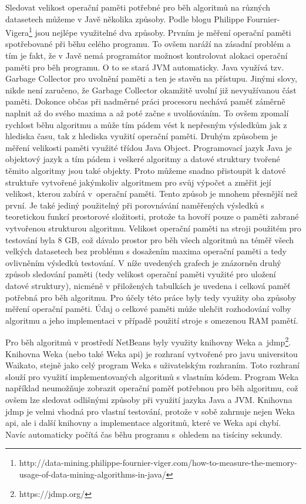 \documentclass[12pt]{article}
\begin{document}
Sledovat velikost operační paměti potřebné pro běh algoritmů na různých datasetech můžeme v Javě několika způsoby. Podle blogu Philippe Fournier-Vigera\footnote{http://data-mining.philippe-fournier-viger.com/how-to-measure-the-memory-usage-of-data-mining-algorithms-in-java/} jsou nejlépe využitelné dva způsoby. Prvním je měření operační paměti spotřebované při běhu celého programu. To ovšem naráží na zásadní problém a tím je fakt, že v Javě nemá programátor možnost kontrolovat alokaci operační paměti pro běh programu. O to se stará JVM automaticky. Java využívá tzv. Garbage Collector pro uvolnění paměti a ten je stavěn na  přístupu. Jinými slovy, nikde není zaručeno, že Garbage Collector okamžitě uvolní již nevyužívanou část paměti. Dokonce občas při nadměrné práci procesoru nechává paměť záměrně naplnit až do svého maxima a až poté začne s uvolňováním. To ovšem zpomalí rychlost běhu algoritmu a může tím pádem vést k nepřesným výsledkům jak z hlediska času, tak z hlediska využití operační paměti. 
\newline
\indent
Druhým způsobem je měření velikosti paměti využité třídou Java Object. Programovací jazyk Java je objektový jazyk a tím pádem i veškeré algoritmy a datové struktury tvořené těmito algoritmy jsou také objekty. Proto můžeme snadno přistoupit k datové struktuře vytvořené jakýmkoliv algoritmem pro svůj výpočet a změřit její velikost, kterou zabírá v~operační paměti. Tento způsob je mnohem přesnější než první. Je také jediný použitelný při porovnávání naměřených výsledků s teoretickou funkcí prostorové složitosti, protože ta hovoří pouze o paměti zabrané vytvořenou strukturou algoritmu. 
\newline
\indent
Velikost operační paměti na stroji použitém pro testování byla 8 GB, což dávalo prostor pro běh všech algoritmů na téměř všech velkých datasetech bez problému s dosažením maxima operační paměti a tedy ovlivněním výsledků testování. V níže uvedených grafech je znázorněn druhý způsob sledování paměti (tedy velikost operační paměti využité pro uložení datové struktury), nicméně v přiložených tabulkách je uvedena i celková paměť potřebná pro běh algoritmu. Pro účely této práce byly tedy využity oba způsoby měření operační paměti. Údaj o celkové paměti může ulehčit rozhodování volby algoritmu a jeho implementaci v případě použití stroje s omezenou RAM pamětí. 

Pro běh algoritmů v prostředí NetBeans byly využity knihovny Weka a~jdmp\footnote{https://jdmp.org/}. Knihovna Weka (nebo také Weka api) je rozhraní vytvořené pro javu universitou Waikato, stejně jako celý program Weka s uživatelským rozhraním. Toto rozhraní slouží pro využití implementovaných algoritmů s vlastním kódem. Program Weka například neumožňuje zobrazit operační paměť potřebnou pro běh algoritmu, což ovšem lze sledovat odlišnými způsoby při využití jazyka Java a JVM. 
\newline
\indent
Knihovna jdmp je velmi vhodná pro vlastní testování, protože v sobě zahrnuje nejen Weka api, ale i další knihovny a implementace algoritmů, které ve Weka api chybí. Navíc automaticky počítá čas běhu programu s~ohledem na tisíciny sekundy. 
\end{document}
